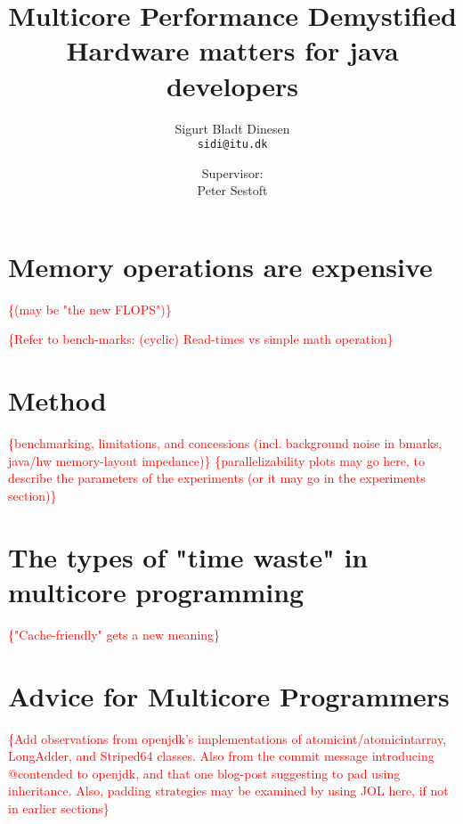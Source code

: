 \documentclass[a4paper, titlepage]{report}
\renewcommand{\%}{\protect\scalebox{.9}{\oldpct}}
\newcommand\mynote[1]{\noindent\textcolor{red}{\{#1\}}}
\begin{document}
\title{Multicore Performance Demystified\\
\hfill \break
\large Hardware matters for java developers
}
\author{
	Sigurt Bladt Dinesen
	\\\texttt{sidi@itu.dk}
	\and
	Supervisor:
	\\Peter Sestoft
}

\maketitle
\tableofcontents
\clearpage









\chapter{Memory operations are expensive}
\mynote{(may be "the new FLOPS")}

\mynote{Refer to bench-marks: (cyclic) Read-times vs simple math operation}

\chapter{Method}
\mynote{benchmarking, limitations, and concessions (incl. background
noise in bmarks, java/hw memory-layout impedance)}
\mynote{parallelizability plots may go here, to describe the parameters of the
experiments (or it may go in the experiments section)}

\chapter{The types of "time waste" in multicore programming}
\mynote{"Cache-friendly" gets a new meaning}



\chapter{Advice for Multicore Programmers}
\mynote{Add observations from openjdk's implementations of
atomicint/atomicintarray, LongAdder, and Striped64 classes. Also from the commit
message introducing @contended to openjdk, and that one blog-post suggesting to
pad using inheritance. Also, padding strategies may be examined by using JOL
here, if not in earlier sections}

\clearpage
\nocite{*}


\end{document}
